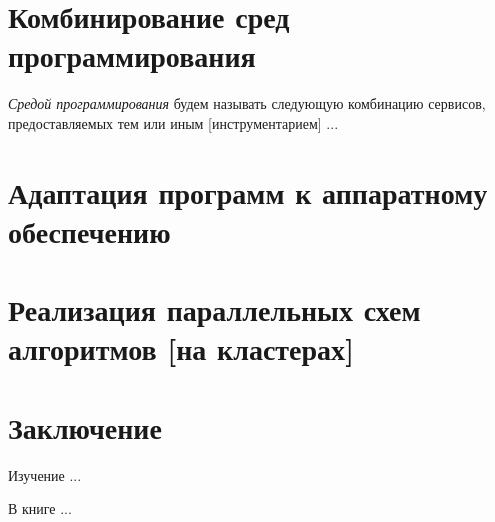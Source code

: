 \documentclass[14pt, openany, twoside, draft]{extbook} %
\newcommand{\e}[2][fcolor]{\textcolor{pcolor}{[}\textcolor{#1}{#2}\textcolor{pcolor}{]}}
\begin{document}
\chapter{Комбинирование сред программирования}

\emph{Средой программирования} будем называть следующую
комбинацию сервисов, предоставляемых тем или иным \e{инструментарием} ...

\chapter{Адаптация программ к аппаратному обеспечению}

\chapter{Реализация параллельных схем алгоритмов \e{на кластерах}}


\chapter*{Заключение}


Изучение ...

В книге ...
\end{document}
